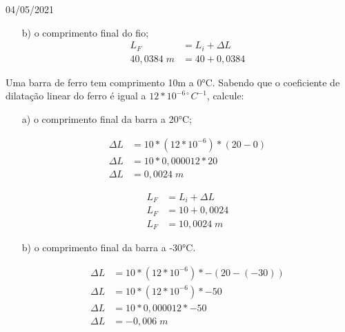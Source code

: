 \documentclass{SchoolBook}
\begin{document}
\begin{day}{04/05/2021}
\begin{enumerate}
            \item[b)] o comprimento final do fio;
            \begin{align*}
                L_F &= L_i + \Delta L \\
                40,0384\;m &= 40 + 0,0384
            \end{align*}
        \end{enumerate}
        
        Uma barra de ferro tem comprimento 10m a 0°C. Sabendo que o coeficiente de dilatação linear do ferro é igual a $12 * 10^{-6\circ}C^{-1}$, calcule:
        
        \begin{enumerate}
            \item[a)] o comprimento final da barra a 20°C;
            \begin{multicols}{2}
                \begin{align*}
                    \Delta L &= 10 * (12 * 10^{-6}) * (20 - 0) \\
                    \Delta L &= 10 * 0,000012 * 20             \\
                    \Delta L &= 0,0024\;m                       
                \end{align*}
                
                \begin{align*}
                     L_F &= L_i + \Delta L \\
                     L_F &= 10 + 0,0024    \\
                     L_F &= 10,0024\;m
                \end{align*}
            \end{multicols}
            
            \item[b)] o comprimento final da barra a -30°C.
            \vspace{-24pt}
            \begin{multicols}{2}
                \begin{align*}
                    \Delta L &= 10 * (12 * 10^{-6}) * -(20 - (-30)) \\
                    \Delta L &= 10 * (12 * 10^{-6}) * -50           \\
                    \Delta L &= 10 * 0,000012 * -50                 \\
                    \Delta L &= -0,006\;m                           \\
                \end{align*}
                

\end{multicols}
\end{enumerate}
\end{day}
\end{document}
